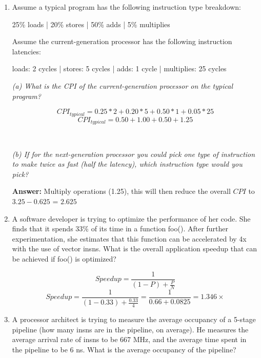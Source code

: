 \documentclass[12pt]{article}
\newenvironment{QandA}{\begin{enumerate}[label=\bfseries\arabic*.]\bfseries}
                      {\end{enumerate}}
\newenvironment{answered}{\par\quad\normalfont}{}
\begin{document}
\begin{QandA}
   \item Assume a typical program has the following instruction type breakdown:
   
    25\% loads | 20\% stores | 50\% adds | 5\% multiplies

    Assume the current-generation processor has the following instruction latencies:
    
    loads: 2 cycles | stores: 5 cycles | adds: 1 cycle | multiplies: 25 cycles

    \begin{answered}
    
    \textit{(a) What is the CPI of the current-generation processor on the typical program?}
    
    \begin{equation*}
        CPI_{typical} = 0.25 * 2 + 0.20 * 5 + 0.50 * 1 + 0.05 * 25
    \end{equation*}
    \begin{equation*}
        CPI_{typical} = 0.50 + 1.00 + 0.50 + 1.25
    \end{equation*}    
    
    \ 
    
    \textit{(b) If for the next-generation processor you could pick one type of instruction to
make twice as fast (half the latency), which instruction type would you pick?}

    \textbf{Answer:} Multiply operations (1.25), this will then reduce the overall $CPI$ to $3.25 - 0.625$ = $2.625$ 
    \end{answered}
    
    \item A software developer is trying to optimize the performance of her code. She finds that it spends 33\% of its time in a function foo(). After further experimentation, she estimates that this function can be accelerated by 4x with the use of vector insns. What is the overall application speedup that can be achieved if foo() is optimized?
    
    \begin{equation*}
    Speedup = \frac{1}{(1-P)+\frac{P}{N}}    
    \end{equation*}
    \begin{equation*}
    Speedup = \frac{1}{(1-0.33)+\frac{0.33}{4}} = \frac{1}{0.66+0.0825} = 1.346\times
    \end{equation*}
    
    \item A processor architect is trying to measure the average occupancy of a 5-stage pipeline (how many insns are in the pipeline, on average). He measures the average arrival rate of insns to be 667 MHz, and the average time spent in the pipeline to be 6 ns. What is the average occupancy of the pipeline?
    

\end{QandA}
\end{document}
